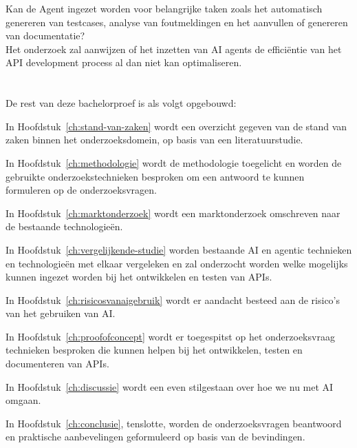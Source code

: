 Kan de Agent ingezet worden voor belangrijke taken zoals het automatisch genereren van testcases, analyse van foutmeldingen en het aanvullen of genereren van documentatie? \\

Het onderzoek zal aanwijzen of het inzetten van AI agents de efficiëntie van het API development process al dan niet kan optimaliseren.

\section{}%
\label{sec:opzet-bachelorproef}


De rest van deze bachelorproef is als volgt opgebouwd:

In Hoofdstuk~\ref{ch:stand-van-zaken} wordt een overzicht gegeven van de stand van zaken binnen het onderzoeksdomein, op basis van een literatuurstudie.

In Hoofdstuk~\ref{ch:methodologie} wordt de methodologie toegelicht en worden de gebruikte onderzoekstechnieken besproken om een antwoord te kunnen formuleren op de onderzoeksvragen.

In Hoofdstuk~\ref{ch:marktonderzoek} wordt een marktonderzoek omschreven naar de bestaande technologieën.

In Hoofdstuk~\ref{ch:vergelijkende-studie} worden bestaande AI en agentic technieken en technologieën met elkaar vergeleken en zal onderzocht worden welke mogelijks kunnen ingezet worden bij het ontwikkelen en testen van APIs.

In Hoofdstuk~\ref{ch:risicosvanaigebruik} wordt er aandacht besteed aan de risico's van het gebruiken van AI.

In Hoofdstuk~\ref{ch:proofofconcept} wordt er toegespitst op het onderzoeksvraag technieken besproken die kunnen helpen bij het ontwikkelen, testen en documenteren van APIs.

In Hoofdstuk~\ref{ch:discussie} wordt een even stilgestaan over hoe we nu met AI omgaan.

In Hoofdstuk~\ref{ch:conclusie}, tenslotte, worden de onderzoeksvragen beantwoord en praktische aanbevelingen geformuleerd op basis van de bevindingen.